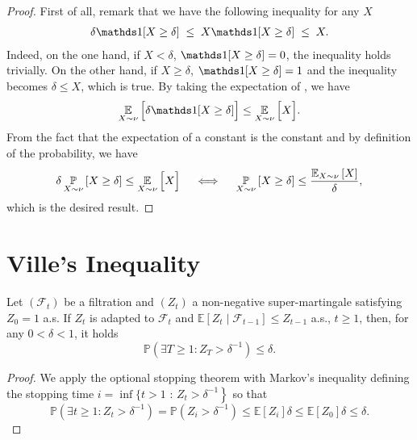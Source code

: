 \begin{noaddcontents}\begin{proof}
First of all, remark that we have the following inequality for any $X$
\begin{align}
    \delta\indic[X \ge \delta] \;\le\; X\indic[X \ge \delta] \;\le\; X.
    \label{ap:tools:eq:proof-general-markov}
\end{align}
Indeed, on the one hand, if $X<\delta$, $\indic[X \ge \delta]=0$, the inequality holds trivially.
On the other hand, if $X\ge\delta$, $\indic[X \ge \delta]=1$ and the inequality becomes $\delta\le X$, which is true.
By taking the expectation of , we have
\begin{align*}
    \EE_{X\sim\nu}\Big[\delta\indic[X \ge \delta]\Big] \le \EE_{X\sim\nu}\Big[ X\Big].
\end{align*}
From the fact that the expectation of a constant is the constant and by definition of the probability, we have
\begin{align*}
    \delta\operatorname*{\mathbb{P}}_{X\sim\nu}\left[ X \ge \delta\right] \le \operatorname*{\mathbb{E}}_{X\sim\nu}\Big[ X\Big] \quad\iff\quad \operatorname*{\mathbb{P}}_{X\sim\nu}\left[ X \ge \delta\right] \le \frac{\operatorname*{\mathbb{E}}_{X\sim\nu}\left[ X\right]}{\delta},
\end{align*}
which is the desired result.
\end{proof}\end{noaddcontents}

\section{Ville's Inequality}

\begin{lemma}
    \label{l: ville_ineq}
    Let $\left(\mathcal{F}_{t}\right)$ be a filtration and $\left(Z_{t}\right)$ a non-negative super-martingale satisfying $Z_{0}=1$ a.s. If $Z_{t}$ is adapted to $\mathcal{F}_{t}$
    and $\mathbb{E}\left[Z_{t} \mid \mathcal{F}_{t-1}\right] \leq Z_{t-1}$ a.s., $t \geq 1$, then, for any $0<\delta<1$, it holds
    $$
    \mathbb{P}\left(\exists T \geq 1: Z_{T}>\delta^{-1}\right) \leq \delta.
    $$
    \end{lemma}
    
    \begin{noaddcontents}\begin{proof}
      We apply the optional stopping theorem \citep[][Thm 4.8.4]{durrett2019probability} with Markov's inequality defining the stopping time $i=\inf \{t>1$ : $\left.Z_{t}>\delta^{-1}\right\}$ so that
      $$
      \mathbb{P}\left(\exists t \geq 1: Z_{t}>\delta^{-1}\right)=\mathbb{P}\left(Z_{i}>\delta^{-1}\right) \leq \mathbb{E}\left[Z_{i}\right] \delta \leq \mathbb{E}\left[Z_{0}\right] \delta \leq \delta.
      $$
    \end{proof}\end{noaddcontents}
    